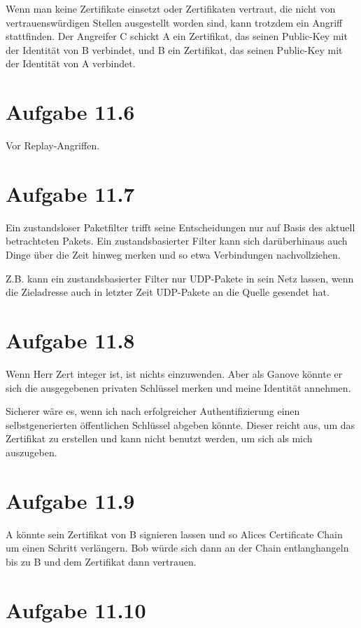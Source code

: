 \documentclass[10pt,a4paper]{article}
\begin{document}
Wenn man keine Zertifikate einsetzt oder Zertifikaten vertraut, die nicht von
vertrauenswürdigen Stellen ausgestellt worden sind, kann trotzdem ein Angriff
stattfinden. Der Angreifer C schickt A ein Zertifikat, das seinen Public-Key mit
der Identität von B verbindet, und B ein Zertifikat, das seinen Public-Key mit
der Identität von A verbindet.

\section{Aufgabe 11.6}

Vor Replay-Angriffen.

\section{Aufgabe 11.7}

Ein zustandsloser Paketfilter trifft seine Entscheidungen nur auf Basis des
aktuell betrachteten Pakets. Ein zustandsbasierter Filter kann sich
darüberhinaus auch Dinge über die Zeit hinweg merken und so etwa Verbindungen
nachvollziehen.

Z.B. kann ein zustandsbasierter Filter nur UDP-Pakete in sein Netz lassen, wenn
die Zieladresse auch in letzter Zeit UDP-Pakete an die Quelle gesendet hat.

\section{Aufgabe 11.8}

Wenn Herr Zert integer ist, ist nichts einzuwenden. Aber als Ganove könnte er
sich die ausgegebenen privaten Schlüssel merken und meine Identität annehmen.

Sicherer wäre es, wenn ich nach erfolgreicher Authentifizierung einen
selbstgenerierten öffentlichen Schlüssel abgeben könnte. Dieser reicht aus, um
das Zertifikat zu erstellen und kann nicht benutzt werden, um sich als mich
auszugeben.

\section{Aufgabe 11.9}

A könnte sein Zertifikat von B signieren lassen und so Alices Certificate Chain
um einen Schritt verlängern. Bob würde sich dann an der Chain entlanghangeln bis
zu B und dem Zertifikat dann vertrauen.

\section{Aufgabe 11.10}
\end{document}
